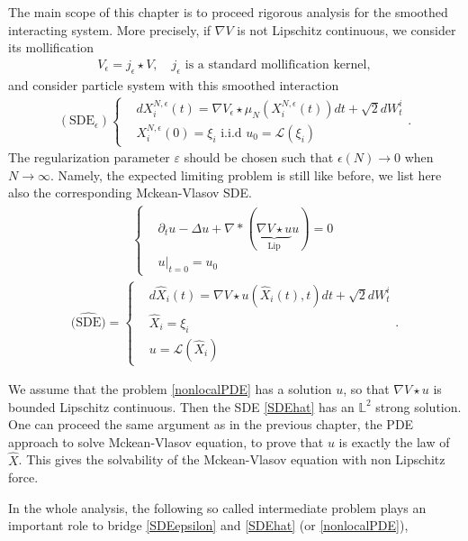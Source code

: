 	 
The main scope of this chapter is to proceed rigorous analysis for the smoothed interacting system.
\vskip3mm
More precisely, if $\nabla V$ is not Lipschitz continuous, we consider its mollification
\begin{align*}
  V_\epsilon = j_{\epsilon}\star V, \quad j_\epsilon\mbox{ is a standard mollification kernel},
\end{align*}
and consider particle system with this smoothed interaction 
 \begin{align} \label{SDEepsilon}
  (\text{SDE}_\epsilon)\begin{cases}
 &dX_i^{N,\epsilon}(t) = \nabla V_\epsilon \star  \mu_N(X_i^{N,\epsilon}(t) ) dt + \sqrt{2}dW_t^i\\
 &X_i^{N,\epsilon}(0) = \xi_i \text{ i.i.d } u_{0}=\mathcal{L}(\xi_i)
 \end{cases}
.\end{align}
The regularization parameter $\varepsilon$ should be chosen such that $\epsilon(N)\rightarrow 0$ when $N\rightarrow \infty$. Namely, the expected limiting problem is still like before, we list here also the corresponding Mckean-Vlasov SDE.
\begin{align}\label{nonlocalPDE}
\begin{cases}
&\partial_t u - \Delta  u+ \nabla* (\underbrace{\nabla V \star  u}_{\text{Lip}} u) = 0 \\
&u \rvert_{t=0} = u_{0}
\end{cases}
\end{align}
\begin{align}\label{SDEhat}
\widehat{\text{(SDE)}}=\begin{cases}
&d \hat{X}_i (t)= \nabla V \star  u(\hat{X}_i(t),t )  dt + \sqrt{2}dW_t^i\\
&\hat{X}_i = \xi_i \\
&u = \mathcal{L}(\hat{X}_i )
\end{cases} 
.\end{align}

We assume that the problem \autoref{nonlocalPDE} has a solution $u$, so that $\nabla V\star u$ is bounded Lipschitz continuous. Then the SDE \autoref{SDEhat} has an $\mathbb{L}^2$ strong solution. One can proceed the same argument as in the previous chapter, the PDE approach to solve Mckean-Vlasov equation, to prove that $u$ is exactly the law of $\hat{X}$. This gives the solvability of the Mckean-Vlasov equation with non Lipschitz force. 

In the whole analysis, the following so called intermediate problem plays an important role to bridge \autoref{SDEepsilon} and \autoref{SDEhat} (or \autoref{nonlocalPDE}),

